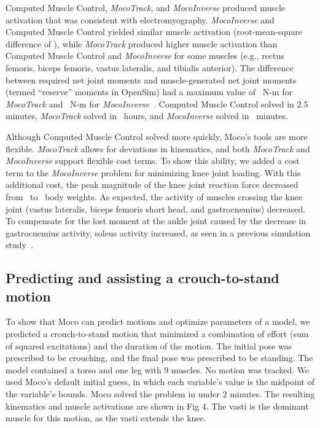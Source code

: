 \documentclass[10pt,letterpaper]{article}
\begin{document}
Computed Muscle Control, \textit{MocoTrack}, and \textit{MocoInverse} produced muscle activation that was consistent with electromyography. \textit{MocoInverse} and Computed Muscle Control yielded similar muscle activation (root-mean-square difference of \unskip), while \textit{MocoTrack} produced higher muscle activation than Computed Muscle Control and \textit{MocoInverse} for some muscles (e.g., rectus femoris, biceps femoris, vastus lateralis, and tibialis anterior). The difference between required net joint moments and muscle-generated net joint moments (termed “reserve” moments in OpenSim) had a maximum value of \unskip~N-m for \textit{MocoTrack} and \unskip~N-m for \textit{MocoInverse}~\cite{Hicks:2015bo}. Computed Muscle Control solved in 2.5 minutes, \textit{MocoTrack} solved in \unskip~hours, and \textit{MocoInverse} solved in \unskip~minutes.

Although Computed Muscle Control solved more quickly, Moco’s tools are more flexible. \textit{MocoTrack} allows for deviations in kinematics, and both \textit{MocoTrack} and \textit{MocoInverse} support flexible cost terms. To show this ability, we added a cost term to the \textit{MocoInverse} problem for minimizing knee joint loading. With this additional cost, the peak magnitude of the knee joint reaction force decreased from \unskip~to \unskip~body weights. As expected, the activity of muscles crossing the knee joint (vastus lateralis, biceps femoris short head, and gastrocnemius) decreased. To compensate for the lost moment at the ankle joint caused by the decrease in gastrocnemius activity, soleus activity increased, as seen in a previous simulation study~\cite{DeMers:2014}.

\subsection*{Predicting and assisting a crouch-to-stand motion}

To show that Moco can predict motions and optimize parameters of a model, we predicted a crouch-to-stand motion that minimized a combination of effort (sum of squared excitations) and the duration of the motion. The initial pose was prescribed to be crouching, and the final pose was prescribed to be standing. The model contained a torso and one leg with 9 muscles. No motion was tracked. We used Moco’s default initial guess, in which each variable’s value is the midpoint of the variable’s bounds. Moco solved the problem in under 2 minutes. The resulting kinematics and muscle activations are shown in Fig 4. The vasti is the dominant muscle for this motion, as the vasti extends the knee.
\end{document}
